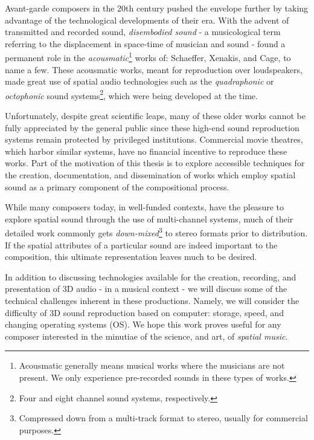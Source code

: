 Avant-garde composers in the 20th century pushed the envelope further by taking advantage of the technological developments of their era. With the advent of transmitted and recorded sound, \textit{disembodied sound} - a musicological term referring to the displacement in space-time of musician and sound - found a permanent role in the \textit{acousmatic}\footnote{Acousmatic generally means musical works where the musicians are not present. We only experience pre-recorded sounds in these types of works.} works of: Schaeffer, Xenakis, and Cage, to name a few. These acousmatic works, meant for reproduction over loudspeakers, made great use of spatial audio technologies such as the \textit{quadraphonic} or \textit{octophonic} sound systems\footnote{Four and eight channel sound systems, respectively.}, which were being developed at the time. 

Unfortunately, despite great scientific leaps, many of these older works cannot be fully appreciated by the general public since these high-end sound reproduction systems remain protected by privileged institutions. Commercial movie theatres, which harbor similar systems, have no financial incentive to reproduce these works. Part of the motivation of this thesis is to explore accessible techniques for the creation, documentation, and dissemination of works which employ spatial sound as a primary component of the compositional process. 

While many composers today, in well-funded contexts, have the pleasure to explore spatial sound through the use of multi-channel systems, much of their detailed work commonly gets \textit{down-mixed}\footnote{Compressed down from a multi-track format to stereo, usually for commercial purposes.} to stereo formats prior to distribution. If the spatial attributes of a particular sound are indeed important to the composition, this ultimate representation leaves much to be desired. %

In addition to discussing technologies available for the creation, recording, and presentation of 3D audio - in a musical context - we will discuss some of the technical challenges inherent in these productions. Namely, we will consider the difficulty of 3D sound reproduction based on computer: storage, speed, and changing operating systems (OS). We hope this work proves useful for any composer interested in the minutiae of the science, and art, of \textit{spatial music}.

